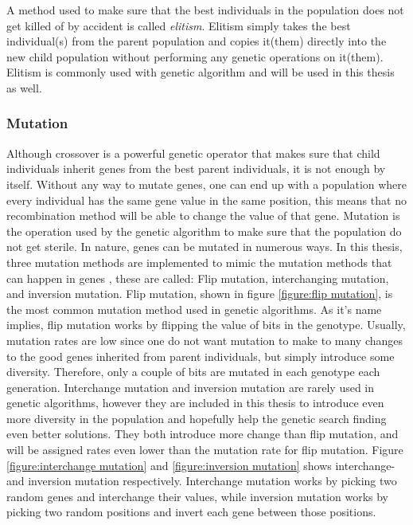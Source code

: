 \noindent A method used to make sure that the best individuals in the population does not get killed of by accident is called \textit{elitism}. Elitism simply takes the best individual(s) from the parent population and copies it(them) directly into the new child population without performing any genetic operations on it(them). Elitism is commonly used with genetic algorithm and will be used in this thesis as well. 


\subsubsection{Mutation}
Although crossover is a powerful genetic operator that makes sure that child individuals inherit genes from the best parent individuals, it is not enough by itself. Without any way to mutate genes, one can end up with a population where every individual has the same gene value in the same position, this means that no recombination method will be able to change the value of that gene. Mutation is the operation used by the genetic algorithm to make sure that the population do not get sterile. In nature, genes can be mutated in numerous ways. In this thesis, three mutation methods are implemented to mimic the mutation methods that can happen in genes \citep{Soni}, these are called: Flip mutation, interchanging mutation, and inversion mutation. Flip mutation, shown in figure \ref{figure:flip mutation}, is the most common mutation method used in genetic algorithms. As it's name implies, flip mutation works by flipping the value of bits in the genotype. Usually, mutation rates are low since one do not want mutation to make to many changes to the good genes inherited from parent individuals, but simply introduce some diversity. Therefore, only a couple of bits are mutated in each genotype each generation. Interchange mutation and inversion mutation are rarely used in genetic algorithms, however they are included in this thesis to introduce even more diversity in the population and hopefully help the genetic search finding even better solutions. They both introduce more change than flip mutation, and will be assigned rates even lower than the mutation rate for flip mutation. Figure \ref{figure:interchange mutation} and \ref{figure:inversion mutation} shows interchange- and inversion mutation respectively. Interchange mutation works by picking two random genes and interchange their values, while inversion mutation works by picking two random positions and invert each gene between those positions. 


